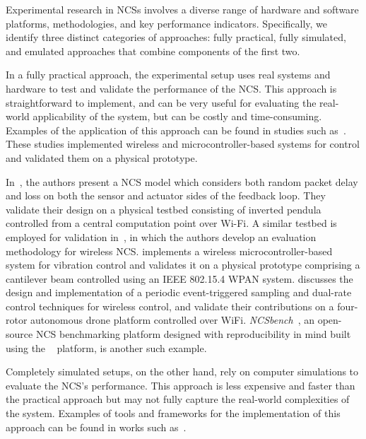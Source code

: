Experimental research in \glspl{NCS} involves a diverse range of hardware and software platforms, methodologies, and key performance indicators.
Specifically, we identify three distinct categories of approaches: fully practical, fully simulated, and emulated approaches that combine components of the first two.

In a fully practical approach, the experimental setup uses real systems and hardware to test and validate the performance of the \gls{NCS}.
This approach is straightforward to implement, and can be very useful for evaluating the real-world applicability of the system, but can be costly and time-consuming.
Examples of the application of this approach can be found in studies such as~\cite{drew2005networked,baumann2018evaluating,li2014wireless,cuenca2019periodic}.
These studies implemented wireless and microcontroller-based systems for control and validated them on a physical prototype.

In~\cite{drew2005networked}, the authors present a \gls{NCS} model which considers both random packet delay and loss on both the sensor and actuator sides of the feedback loop.
They validate their design on a physical testbed consisting of inverted pendula controlled from a central computation point over Wi-Fi.
A similar testbed is employed for validation in~\cite{baumann2018evaluating}, in which the authors develop an evaluation methodology for wireless \gls{NCS}.\@
\cite{li2014wireless} implements a wireless microcontroller-based system for vibration control and validates it on a physical prototype comprising a cantilever beam controlled using an \acs{IEEE} 802.15.4 \gls{WPAN} system.\@ \cite{cuenca2019periodic} discusses the design and implementation of a periodic event-triggered sampling and dual-rate control techniques for wireless control, and validate their contributions on a four-rotor autonomous drone platform controlled over WiFi.
\emph{NCSbench}~\cite{zoppi2020ncsbench}, an open-source \gls{NCS} benchmarking platform designed with reproducibility in mind built using the ~\cite{LEGOMindstormsEV3} platform, is another such example.

Completely simulated setups, on the other hand, rely on computer simulations to evaluate the \gls{NCS}'s performance.
This approach is less expensive and faster than the practical approach but may not fully capture the real-world complexities of the system.
Examples of tools and frameworks for the implementation of this approach can be found in works such as~\cite{andersson2005simulation,eyisi2012ncswt}.

